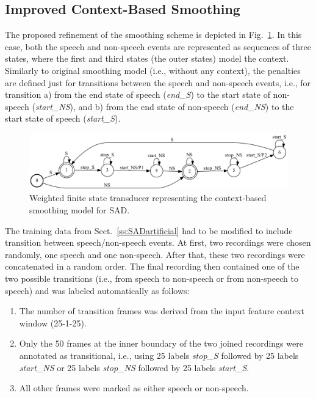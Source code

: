 \documentclass[FM,noheader,EN,bwtitles]{tulthesis}
\begin{document}
\subsection{Improved Context-Based Smoothing}
\label{ss:SADcontext}
The proposed refinement of the smoothing scheme is depicted in Fig.~\ref{fig:t3}.
In this case, both the speech and non-speech events are represented as sequences of three states, where the first and third states (the outer states) model the context.
Similarly to original smoothing model (i.e., without any context), the penalties are defined just for transitions between the speech and non-speech events, i.e., for transition a) from the end state of speech (\textit{end\_S}) to the start state of non-speech (\textit{start\_NS}), and b) from the end state of non-speech (\textit{end\_NS}) to the start state of speech (\textit{start\_S}).

\begin{figure}[ht]
\centering
	\includegraphics[scale=0.57]{img/cont.pdf}
\caption{{Weighted finite state transducer representing the context-based smoothing model for SAD.}}
\label{fig:t3}
\end{figure}

The training data from Sect.~\ref{ss:SADartificial} had to be modified to include transition between speech/non-speech events.
At first, two recordings were chosen randomly, one speech and one non-speech.
After that, these two recordings were concatenated in a random order.
The final recording then contained one of the two possible transitions (i.e., from speech to non-speech or from non-speech to speech) and was labeled automatically as follows:

\begin{enumerate}
	\item The number of transition frames was derived from the input feature context window (25-1-25).
	\item Only the 50 frames at the inner boundary of the two joined recordings were annotated as transitional, i.e., using 25 labels \textit{stop\_S} followed by 25 labels \textit{start\_NS} or 25 labels \textit{stop\_NS} followed by 25 labels \textit{start\_S}.
	\item All other frames were marked as either speech or non-speech.
\end{enumerate}
\end{document}
